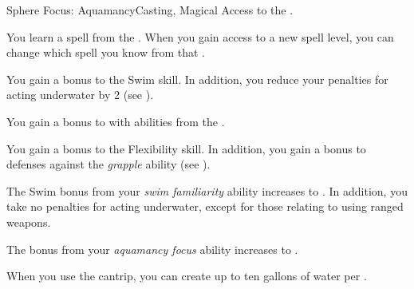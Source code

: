     \begin{feat}{Sphere Focus: Aquamancy}{Casting, Magical}
        \featpre Access to the  .

         You learn a spell from the  .
        When you gain access to a new spell level, you can change which spell you know from that .

         You gain a  bonus to the Swim skill.
        In addition, you reduce your penalties for acting underwater by 2 (see ).

         You gain a  bonus to  with abilities from the  .

         You gain a  bonus to the Flexibility skill.
        In addition, you gain a  bonus to defenses against the \textit{grapple} ability (see ).

         The Swim bonus from your \textit{swim familiarity} ability increases to .
        In addition, you take no penalties for acting underwater, except for those relating to using ranged weapons.

         The bonus from your \textit{aquamancy focus} ability increases to .

         When you use the  cantrip, you can create up to ten gallons of water per .
    \end{feat}

